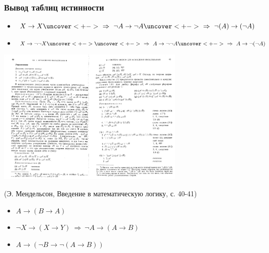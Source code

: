 \documentclass[24pt,pdf,hyperref={unicode},aspectratio=169]{beamer}
\begin{document}
\begin{frame}\frametitle{Вывод таблиц истинности}
\begin{itemize}[<+->]
\item $X\rightarrow X \uncover<+->{\ \Rightarrow\ \neg A\rightarrow \neg A} \uncover<+->{\ \Rightarrow\ \neg(A)\rightarrow(\neg A)}$
\item $X\rightarrow \neg\neg X \uncover<+->{}\uncover<+->{\ \Rightarrow\ A\rightarrow \neg\neg A}\uncover<+->{\ \Rightarrow\ A\rightarrow \neg(\neg A)}$
\end{itemize}

{
\begin{center}
\includegraphics[width=9cm]{Mendelson.png}

(Э. Мендельсон, Введение в математическую логику, с. 40-41)
\end{center}
}


\begin{itemize}[<+->]
\item $A\rightarrow(B\rightarrow A)$
\item $\neg X\rightarrow (X\rightarrow Y) {\ \Rightarrow\ \neg A\rightarrow(A\rightarrow B)}$
\item $A\rightarrow(\neg B\rightarrow\neg(A\rightarrow B))$
\end{itemize}
\end{frame}
\end{document}
